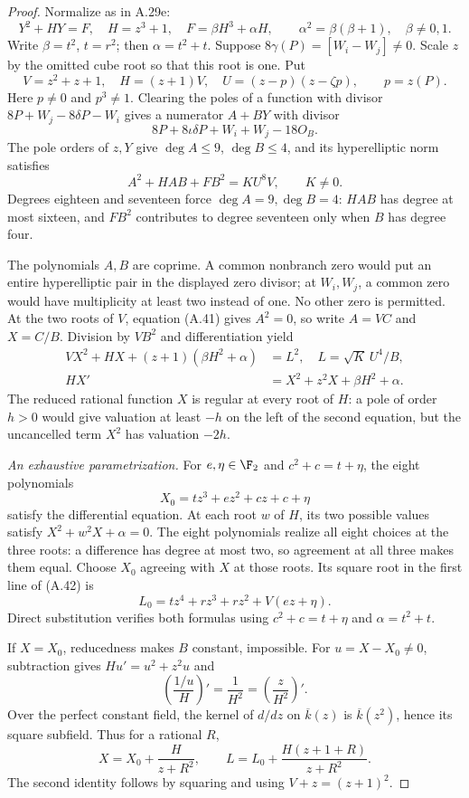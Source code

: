 \begin{proof}
Normalize as in A.29e:
\[
 Y^2+HY=F,\quad H=z^3+1,\quad F=\beta H^3+\alpha H,\qquad
 \alpha^2=\beta(\beta+1),\quad\beta\ne0,1.
\]
Write $\beta=t^2$, $t=r^2$; then $\alpha=t^2+t$.
Suppose $8\gamma(P)=[W_i-W_j]\ne0$. Scale $z$ by the omitted
cube root so that this root is one. Put
\[
 V=z^2+z+1,\quad H=(z+1)V,\quad
 U=(z-p)(z-\zeta p),\qquad p=z(P).
\]
Here $p\ne0$ and $p^3\ne1$. Clearing the poles of a function
with divisor $8P+W_j-8\delta P-W_i$ gives a numerator $A+BY$
with divisor
\[
 8P+8\iota\delta P+W_i+W_j-18O_B.
\]
The pole orders of $z,Y$ give $\deg A\le9$, $\deg B\le4$,
and its hyperelliptic norm satisfies
\[
 A^2+HAB+FB^2=KU^8V,\qquad K\ne0.                       \tag{A.41}
\]
Degrees eighteen and seventeen force $\deg A=9,\deg B=4$:
$HAB$ has degree at most sixteen, and $FB^2$ contributes
to degree seventeen only when $B$ has degree four.

The polynomials $A,B$ are coprime. A common nonbranch zero
would put an entire hyperelliptic pair in the displayed
zero divisor; at $W_i,W_j$, a common zero would have
multiplicity at least two instead of one. No other zero
is permitted. At the two roots of $V$, equation (A.41)
gives $A^2=0$, so write $A=VC$ and $X=C/B$. Division by
$VB^2$ and differentiation yield
\[
\begin{aligned}
 VX^2+HX+(z+1)(\beta H^2+\alpha)&=L^2,
                         \quad L=\sqrt K\,U^4/B,\\
 HX'&=X^2+z^2X+\beta H^2+\alpha.
\end{aligned}                                           \tag{A.42}
\]
The reduced rational function $X$ is regular at every
root of $H$: a pole of order $h>0$ would give valuation
at least $-h$ on the left of the second equation,
but the uncancelled term $X^2$ has valuation $-2h$.

\emph{An exhaustive parametrization.}
For $e,\eta\in\F_2$ and $c^2+c=t+\eta$, the eight polynomials
\[
 X_0=tz^3+ez^2+cz+c+\eta
\]
satisfy the differential equation. At each root $w$ of
$H$, its two possible values satisfy $X^2+w^2X+\alpha=0$.
The eight polynomials realize all eight choices at the
three roots: a difference has degree at most two, so
agreement at all three makes them equal. Choose $X_0$
agreeing with $X$ at those roots. Its square root in
the first line of (A.42) is
\[
 L_0=tz^4+rz^3+rz^2+V(ez+\eta).
\]
Direct substitution verifies both formulas using
$c^2+c=t+\eta$ and $\alpha=t^2+t$.

If $X=X_0$, reducedness makes $B$ constant, impossible.
For $u=X-X_0\ne0$, subtraction gives $Hu'=u^2+z^2u$ and
\[
 \left(\frac{1/u}{H}\right)'=\frac1{H^2}
                         =\left(\frac z{H^2}\right)'.
\]
Over the perfect constant field, the kernel of $d/dz$ on
$\overline{k}(z)$ is $\overline{k}(z^2)$, hence its square
subfield. Thus for a rational $R$,
\[
 X=X_0+\frac{H}{z+R^2},\qquad
 L=L_0+\frac{H(z+1+R)}{z+R^2}.                          \tag{A.43}
\]
The second identity follows by squaring and using
$V+z=(z+1)^2$.


\end{proof}
